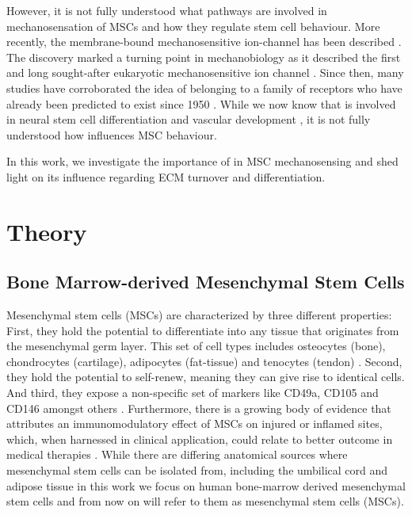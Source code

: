However, it is not fully understood what pathways are involved in mechanosensation of MSCs and how they regulate stem cell behaviour. More recently, the membrane-bound mechanosensitive ion-channel \Piezo{} has been described \cite{Coste2010}. The discovery marked a turning point in mechanobiology as it described the first and long sought-after eukaryotic mechanosensitive ion channel \cite{Sharif-Naeini2015}. Since then, many studies have corroborated the idea of \Piezo{} belonging to a family of receptors who have already been predicted to exist since 1950 \cite{Katz1949}. While we now know that \Piezo{} is involved in neural stem cell differentiation \cite{Pathak2014} and vascular development \cite{Ranade2014}, it is not fully understood how \Piezo{} influences MSC behaviour. \par
In this work, we investigate the importance of \Piezo{} in MSC mechanosensing and shed light on its influence regarding ECM turnover and differentiation.

\section{Theory}

\subsection{Bone Marrow-derived Mesenchymal Stem Cells}

Mesenchymal stem cells (MSCs) are characterized by three different properties: First, they hold the potential to differentiate into any tissue that originates from the mesenchymal germ layer. This set of cell types includes osteocytes (bone), chondrocytes (cartilage), adipocytes (fat-tissue) and tenocytes (tendon) \cite{Ng2008}. Second, they hold the potential to self-renew, meaning they can give rise to identical cells. And third, they expose a non-specific set of markers like CD49a, CD105 and CD146 amongst others \cite{Bianco2013}. Furthermore, there is a growing body of evidence that attributes an immunomodulatory effect of MSCs on injured or inflamed sites, which, when harnessed in clinical application, could relate to better outcome in medical therapies \cite{Caplan2011, Hass2011}.
While there are differing anatomical sources where mesenchymal stem cells can be isolated from, including the umbilical cord and adipose tissue \cite{Barlow2008, Hass2011} in this work we focus on human bone-marrow derived mesenchymal stem cells and from now on will refer to them as mesenchymal stem cells (MSCs). 

